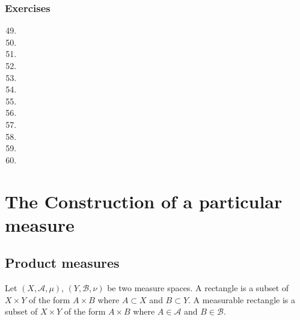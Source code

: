 \subsubsection{Exercises}
\begin{enumerate}
	\setcounter{enumi}{48}
	\item
	\item
	\item
	\item
	\item
	\item
	\item
	\item
	\item
	\item
	\item
	\item
\end{enumerate}


\setcounter{section}{19}
\section{The Construction of a particular measure}
\subsection{Product measures}

\begin{definition}
	Let $(X,\mathcal{A},\mu)$, $(Y,\mathcal{B},\nu)$ be two measure spaces.
	A rectangle is a subset of $X \times Y$ of the form $A \times B$ where $A \subset X$ and $B \subset Y$.
	A measurable rectangle is a subset of $X \times Y$ of the form $A \times B$ where $A \in \mathcal{A}$ and $B \in \mathcal{B}$.
\end{definition}

